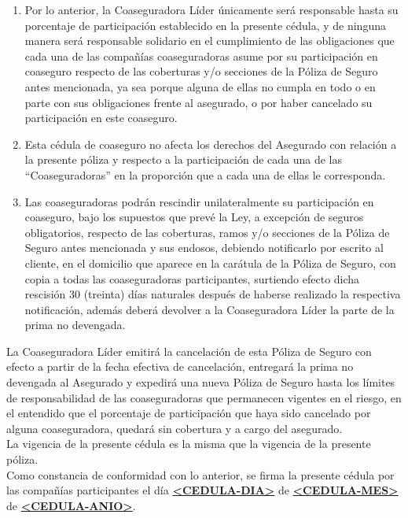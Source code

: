 \documentclass[letterpaper,10pt]{article}
\begin{document}
\begin{enumerate}
\begin{enumerate}
            \item Por lo anterior, la Coaseguradora Líder únicamente será responsable hasta su porcentaje de participación establecido en la presente cédula, y de ninguna manera será responsable solidario en el cumplimiento de las obligaciones que cada una de las compañías coaseguradoras asume por su participación en coaseguro respecto de las coberturas y/o secciones de la Póliza de Seguro antes mencionada, ya sea porque alguna de ellas no cumpla en todo o en parte con sus obligaciones frente al asegurado, o por haber cancelado su participación en este coaseguro.
            \item Esta cédula de coaseguro no afecta los derechos del Asegurado con relación a la presente póliza y respecto a la participación de cada una de las ``Coaseguradoras'' en la proporción que a cada una de ellas le corresponda.
            \item Las coaseguradoras podrán rescindir unilateralmente su participación en coaseguro, bajo los supuestos que prevé la Ley, a excepción de seguros obligatorios, respecto de las coberturas, ramos y/o secciones de la Póliza de Seguro antes mencionada y sus endosos, debiendo notificarlo por escrito al cliente, en el domicilio que aparece en la carátula de la Póliza de Seguro, con copia a todas las coaseguradoras participantes, surtiendo efecto dicha rescisión 30 (treinta) días naturales después de haberse realizado la respectiva notificación, además deberá devolver a la Coaseguradora Líder la parte de la prima no devengada.
        \end{enumerate}
\end{enumerate}

La Coaseguradora Líder emitirá la cancelación de esta Póliza de Seguro con efecto a partir de la fecha efectiva de cancelación, entregará la prima no devengada al Asegurado y expedirá una nueva Póliza de Seguro hasta los límites de responsabilidad de las coaseguradoras que permanecen vigentes en el riesgo, en el entendido que el porcentaje de participación que haya sido cancelado por alguna coaseguradora, quedará sin cobertura y a cargo del asegurado.\\

La vigencia de la presente cédula es la misma que la vigencia de la presente póliza.\\

Como constancia de conformidad con lo anterior, se firma la presente cédula por las compañías participantes el día \textbf{\underline{<CEDULA-DIA>}} de \textbf{\underline{<CEDULA-MES>}} de \textbf{\underline{<CEDULA-ANIO>}}.\\
\end{document}
